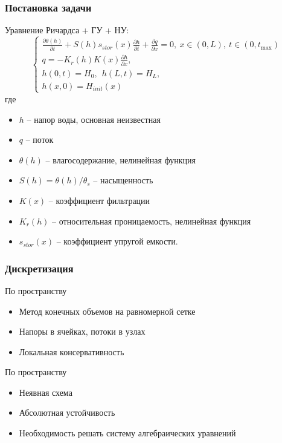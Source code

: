 \documentclass{beamer}
\begin{document}
	\begin{frame}
		\frametitle{Постановка задачи}
		Уравнение Ричардса + ГУ + НУ:
		\begin{equation*}\label{eq:ivp_richards_1d}
			\begin{cases}
					\frac{\partial \theta(h)}{\partial t} + S(h)
				s_{stor}(x)\frac{\partial h}{\partial t} + \frac{\partial q}{\partial x} = 0, ~ x \in (0,L), ~ t\in(0, t_{\max})\\
				q = -K_r(h)K(x)\frac{\partial h}{\partial x},\\
				h(0,t) = H_0,~~h(L,t) = H_L,\\
				h(x,0) = H_{init}(x)
			\end{cases}
		\end{equation*}
		где
		\begin{itemize}
			\item $h$ -- напор воды, основная неизвестная
			\item $q$ -- поток
			\item $\theta(h)$ -- влагосодержание, нелинейная функция
			\item $S(h) = \theta(h)/\theta_s$ -- насыщенность
			\item $K(x)$ -- коэффициент фильтрации
			\item $K_r(h)$ -- относительная проницаемость, нелинейная функция
			\item $s_{stor}(x)$ -- коэффициент упругой емкости.
		\end{itemize}
	\end{frame}
	
	
	\begin{frame}
		\frametitle{Дискретизация}
		По пространству
		\begin{itemize}
			\item Метод конечных объемов на равномерной сетке
			\item Напоры в ячейках, потоки в узлах
			\item Локальная консервативность
		\end{itemize}
		
		
		По пространству
		\begin{itemize}
			\item Неявная схема
			\item Абсолютная устойчивость
			\item Необходимость решать систему алгебраических уравнений
		\end{itemize}
	\end{frame}
	
\end{document}
